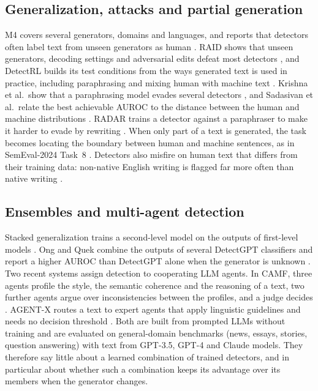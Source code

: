 \documentclass[journal]{IEEEtran}
\begin{document}
\subsection{Generalization, attacks and partial generation}
M4 covers several generators, domains and languages, and reports that detectors often label text from unseen
generators as human \cite{Wang_2024}. RAID shows that unseen generators, decoding settings and adversarial edits
defeat most detectors \cite{Dugan_2024}, and DetectRL builds its test conditions from the ways generated text is used
in practice, including paraphrasing and mixing human with machine text \cite{Wu_2024}. Krishna et al.\ show that a
paraphrasing model evades several detectors \cite{Krishna_2023}, and Sadasivan et al.\ relate the best achievable
AUROC to the distance between the human and machine distributions \cite{Sadasivan_2023}. RADAR trains a detector
against a paraphraser to make it harder to evade by rewriting \cite{Hu_2023}. When only part of a text is generated,
the task becomes locating the boundary between human and machine sentences, as in SemEval-2024 Task~8
\cite{Wang_SemEval_2024,Qu_2024}. Detectors also misfire on human text that differs from their training data:
non-native English writing is flagged far more often than native writing \cite{Liang_2023}.

\subsection{Ensembles and multi-agent detection}
Stacked generalization trains a second-level model on the outputs of first-level models \cite{Wolpert_1992}. Ong and
Quek combine the outputs of several DetectGPT classifiers and report a higher AUROC than DetectGPT alone when the
generator is unknown \cite{Ong_2024}. Two recent systems assign detection to cooperating LLM agents. In
CAMF, three agents profile the style, the semantic coherence and the reasoning of a text, two further agents argue
over inconsistencies between the profiles, and a judge decides \cite{Wang_CAMF_2025}. AGENT-X routes a text to
expert agents that apply linguistic guidelines and needs no decision threshold \cite{Li_AgentX_2025}. Both are
built from prompted LLMs without training and are evaluated on general-domain benchmarks (news, essays, stories,
question answering) with text from GPT-3.5, GPT-4 and Claude models. They therefore say little about a learned
combination of trained detectors, and in particular about whether such a combination keeps its advantage over its
members when the generator changes.
\end{document}
